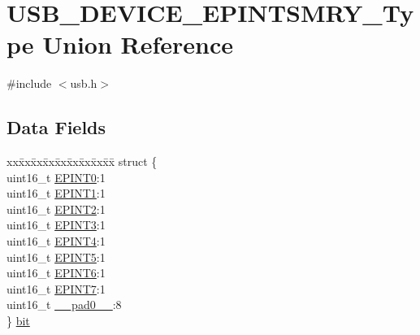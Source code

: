 \hypertarget{union_u_s_b___d_e_v_i_c_e___e_p_i_n_t_s_m_r_y___type}{}\section{U\+S\+B\+\_\+\+D\+E\+V\+I\+C\+E\+\_\+\+E\+P\+I\+N\+T\+S\+M\+R\+Y\+\_\+\+Type Union Reference}
\label{union_u_s_b___d_e_v_i_c_e___e_p_i_n_t_s_m_r_y___type}


{\ttfamily \#include $<$usb.\+h$>$}

\subsection*{Data Fields}
\begin{DoxyCompactItemize}
\item 
\begin{tabbing}
xx\=xx\=xx\=xx\=xx\=xx\=xx\=xx\=xx\=\kill
struct \{\\
\>uint16\_t \mbox{\hyperlink{union_u_s_b___d_e_v_i_c_e___e_p_i_n_t_s_m_r_y___type_a4d26ad3e2297469cc516b6d45f3c7f39}{EPINT0}}:1\\
\>uint16\_t \mbox{\hyperlink{union_u_s_b___d_e_v_i_c_e___e_p_i_n_t_s_m_r_y___type_afb418ab4945c9882fbbadc0c2ae7b77b}{EPINT1}}:1\\
\>uint16\_t \mbox{\hyperlink{union_u_s_b___d_e_v_i_c_e___e_p_i_n_t_s_m_r_y___type_a95228f1d6fd0e7ff7b4f4fbb22220e56}{EPINT2}}:1\\
\>uint16\_t \mbox{\hyperlink{union_u_s_b___d_e_v_i_c_e___e_p_i_n_t_s_m_r_y___type_a572849d24d5906d9ab59f8d217757517}{EPINT3}}:1\\
\>uint16\_t \mbox{\hyperlink{union_u_s_b___d_e_v_i_c_e___e_p_i_n_t_s_m_r_y___type_a295643436e93719995eb614dd251c9b4}{EPINT4}}:1\\
\>uint16\_t \mbox{\hyperlink{union_u_s_b___d_e_v_i_c_e___e_p_i_n_t_s_m_r_y___type_af9f2a98ebe4bb1a543247c137089852e}{EPINT5}}:1\\
\>uint16\_t \mbox{\hyperlink{union_u_s_b___d_e_v_i_c_e___e_p_i_n_t_s_m_r_y___type_af73cf2d7e69e9b18a403dbe13f8f3450}{EPINT6}}:1\\
\>uint16\_t \mbox{\hyperlink{union_u_s_b___d_e_v_i_c_e___e_p_i_n_t_s_m_r_y___type_acb2f7ac05b43be1a27ebe8e216356625}{EPINT7}}:1\\
\>uint16\_t \mbox{\hyperlink{union_u_s_b___d_e_v_i_c_e___e_p_i_n_t_s_m_r_y___type_a77132c2c26a75f5b8751b235cda23828}{\_\_pad0\_\_}}:8\\
\} \mbox{\hyperlink{union_u_s_b___d_e_v_i_c_e___e_p_i_n_t_s_m_r_y___type_ad3b99404ec2578f0e10d68e8a3eeff2f}{bit}}\\


\end{tabbing}
\end{DoxyCompactItemize}
